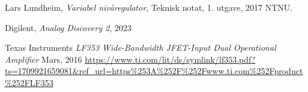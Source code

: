 
    Lars Lundheim,
    \emph{Variabel nivåregulator},
    Teknisk notat,
    1. utgave,
    2017 NTNU.

    Digilent,
    \emph{Analog Discovery 2},
    2023

    Texas Instruments
    \emph{LF353 Wide-Bandwidth JFET-Input Dual Operational Amplifier}
    Mars, 2016
    \url{https://www.ti.com/lit/ds/symlink/lf353.pdf?ts=1709921659081&ref_url=https\%253A\%252F\%252Fwww.ti.com\%252Fproduct\%252FLF353}
